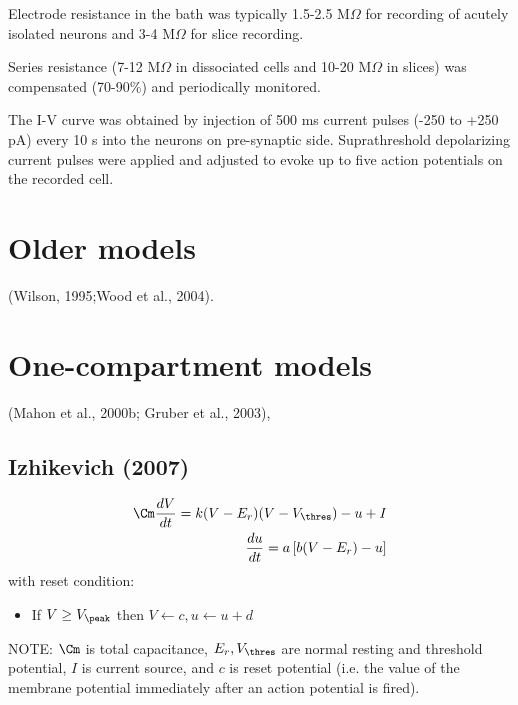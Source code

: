 \begin{mdframed}
Electrode resistance in the bath was typically 1.5-2.5 M$\Omega$ for recording of acutely isolated
neurons and 3-4 M$\Omega$ for slice recording.

Series resistance (7-12 M$\Omega$ in dissociated cells and 10-20 M$\Omega$ in slices) was
compensated (70-90\%) and periodically monitored.
\end{mdframed}

The I-V curve was obtained by injection of 500 ms current pulses (-250 to +250
pA) every 10 s into the neurons on pre-synaptic side.
Suprathreshold depolarizing current pulses were applied and adjusted
to evoke up to five action potentials on the recorded cell.

\section{Older models}

(Wilson, 1995;Wood et al., 2004).


\section{One-compartment models}

(Mahon et al., 2000b; Gruber et al., 2003),

\subsection{Izhikevich (2007)}
\label{sec:Izhikevich-2007-MSN}

\begin{equation}
\begin{split}
\Cm \frac{dV}{dt}= k(V - E_r ) (V - V_\thres) - u + I \\
\frac{du}{dt} = a \left[ b(V - E_r) - u \right]
\end{split}
\end{equation}
with reset condition:
\begin{itemize}
  \item If $V \ge V_\peak$ then $V \leftarrow c, u \leftarrow u + d$
\end{itemize}

NOTE: $\Cm $ is total capacitance, $E_r, V_\thres$ are normal resting and
threshold potential, $I$ is current source, and $c$ is reset potential (i.e. the value of
the membrane potential immediately after an action potential is fired).

